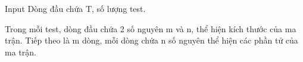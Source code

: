 Input
Dòng đầu chứa T, số lượng test.  

   Trong mỗi test, dòng đầu chứa 2 số nguyên m và n, thể hiện kích thước của ma trận. Tiếp theo là m dòng, mỗi dòng chứa n số nguyên thể hiện các phần tử của ma trận.